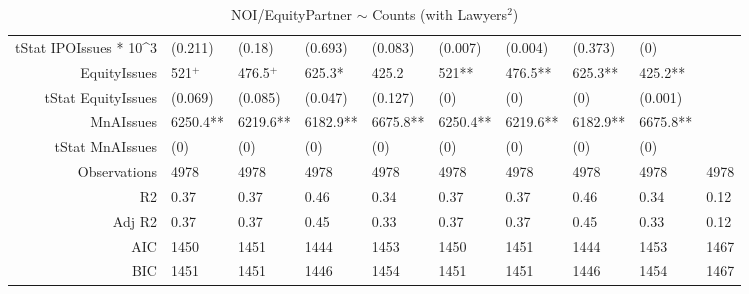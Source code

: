 \begin{table}[ht]
\begin{tabular}{rlllllllll}
  tStat IPOIssues * 10^3 & (0.211) & (0.18) & (0.693) & (0.083) & (0.007) & (0.004) & (0.373) & (0) &  \\ 
  EquityIssues & 521$^{+}$ & 476.5$^{+}$ & 625.3* & 425.2 & 521** & 476.5** & 625.3** & 425.2** &  \\ 
  tStat EquityIssues & (0.069) & (0.085) & (0.047) & (0.127) & (0) & (0) & (0) & (0.001) &  \\ 
  MnAIssues & 6250.4** & 6219.6** & 6182.9** & 6675.8** & 6250.4** & 6219.6** & 6182.9** & 6675.8** &  \\ 
  tStat MnAIssues & (0) & (0) & (0) & (0) & (0) & (0) & (0) & (0) &  \\ 
  Observations & 4978 & 4978 & 4978 & 4978 & 4978 & 4978 & 4978 & 4978 & 4978 \\ 
  R2 & 0.37 & 0.37 & 0.46 & 0.34 & 0.37 & 0.37 & 0.46 & 0.34 & 0.12 \\ 
  Adj R2 & 0.37 & 0.37 & 0.45 & 0.33 & 0.37 & 0.37 & 0.45 & 0.33 & 0.12 \\ 
  AIC & 1450 & 1451 & 1444 & 1453 & 1450 & 1451 & 1444 & 1453 & 1467 \\ 
  BIC & 1451 & 1451 & 1446 & 1454 & 1451 & 1451 & 1446 & 1454 & 1467 \\ 
   \hline
\end{tabular}
\caption{NOI/EquityPartner $\sim$ Counts (with Lawyers$^2$)} 
\end{table}
